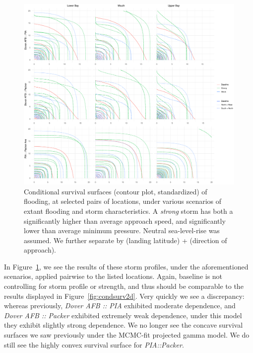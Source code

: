 \begin{figure}[t]
    \centering
    \includegraphics[width=0.95\linewidth]{./plots/condsurv_reg/condsurv_reg_2d.pdf}
    \caption{Conditional survival surfaces (contour plot, standardized) of flooding, at 
        selected pairs of locations, under various scenarios of extant flooding and storm
        characteristics.  A \emph{strong} storm has
        both a significantly higher than average approach speed, and significantly lower 
        than average minimum pressure. Neutral sea-level-rise was assumed.  We further
        separate by (landing latitude) + (direction of approach).\label{fig:condsurvreg2d}
        }
\end{figure}

In Figure~\ref{fig:condsurvreg2d}, we see the results of these storm profiles, under the
    aforementioned scenarios, applied pairwise to the listed locations.  Again, baseline is
    not controlling for storm profile or strength, and thus should be comparable to the
    results displayed in Figure~\ref{fig:condsurv2d}.  Very quickly we see a
    discrepancy: whereas previously, \emph{Dover AFB :: PIA} exhibited moderate dependence, and
    \emph{Dover AFB :: Packer} exhibited extremely weak dependence, under this model they exhibit
    slightly strong dependence.  We no longer see the concave survival surfaces we saw previously
    under the MCMC-fit projected gamma model.  We do still see the highly convex survival surface
    for \emph{PIA::Packer}.  


